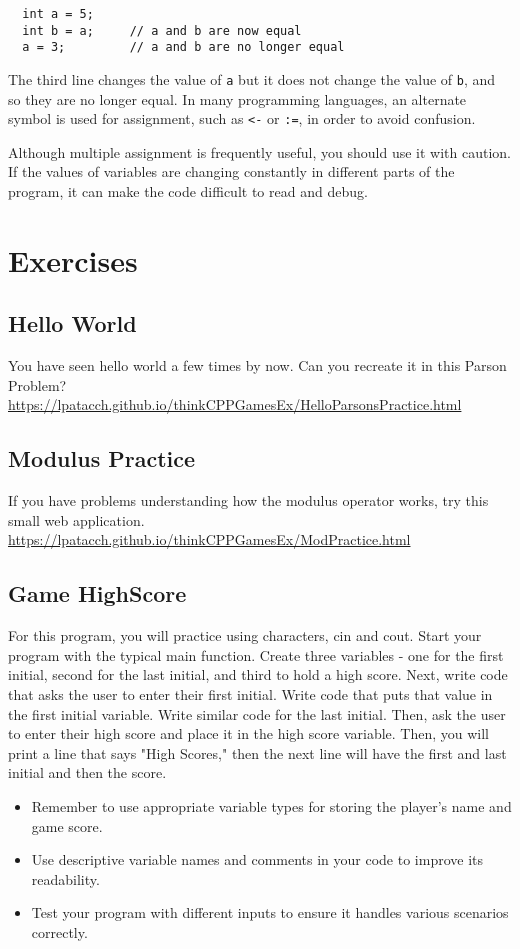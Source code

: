 \begin{lstlisting}
  int a = 5;
  int b = a;     // a and b are now equal
  a = 3;         // a and b are no longer equal
\end{lstlisting}
%
The third line changes the value of {\tt a} but it does not
change the value of {\tt b}, and so they are no longer equal.
In many programming languages, an alternate symbol is used
for assignment, such as {\tt <-} or {\tt :=}, in order to
avoid confusion.

Although multiple assignment is frequently useful, you should
use it with caution.  If the values of variables are changing
constantly in different parts of the program, it can make
the code difficult to read and debug.

\section{Exercises}
\subsection{Hello World}
You have seen hello world a few times by now. Can you recreate it in this Parson Problem? 
\url{https://lpatacch.github.io/thinkCPPGamesEx/HelloParsonsPractice.html} 
\subsection{Modulus Practice}
If you have problems understanding how the modulus operator works, try this small web application.
\url{https://lpatacch.github.io/thinkCPPGamesEx/ModPractice.html}
\subsection{Game HighScore}
For this program, you will practice using characters, cin and cout. Start your program
with the typical main function. Create three
variables - one for the first initial, second
for the last initial, and third to hold a high
score. Next, write code that asks the user to
enter their first initial. Write code that
puts that value in the first initial variable. 
Write similar code for the last initial. Then,
ask the user to enter their high score and place
it in the high score variable. Then, you will
print a line that says "High Scores," then
the next line will have the first and last initial and then the score.
\begin{itemize}
    \item Remember to use appropriate variable types for storing the player's name and game score.
\item Use descriptive variable names and comments in your code to improve its readability.
\item Test your program with different inputs to ensure it handles various scenarios correctly.
\end{itemize}

